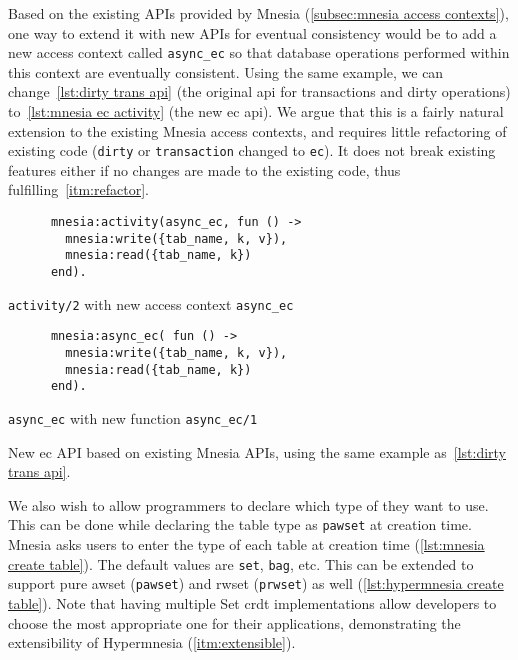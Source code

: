 Based on the existing APIs provided by Mnesia (\cref{subsec:mnesia access contexts}), 
one way to extend it with new APIs for eventual consistency would be to add a
new access context called \texttt{async_ec} so that database operations
performed within this context are eventually consistent. Using
the same example, we can change~\cref{lst:dirty trans api} (the original
\acrshort{api} for transactions and dirty operations) to~\cref{lst:mnesia ec activity} (the
new \acrshort{ec} \acrshort{api}).
We argue that this is a fairly natural extension to the existing Mnesia access contexts,
and requires little refactoring of existing code (\verb|dirty| or \verb|transaction|
changed to \verb|ec|). It does not break existing features either if no changes
are made to the existing code, thus fulfilling~\cref{itm:refactor}.

\begin{listing}[htp]
  \begin{sublisting}{0.48\columnwidth}
    \begin{verbatim}
      mnesia:activity(async_ec, fun () -> 
        mnesia:write({tab_name, k, v}),
        mnesia:read({tab_name, k})
      end).
    \end{verbatim}
    \caption{\texttt{activity/2} with new access context \texttt{async\_ec}}
  \end{sublisting}
  \hfill
  \begin{sublisting}{0.48\columnwidth}
    \begin{verbatim}
      mnesia:async_ec( fun () -> 
        mnesia:write({tab_name, k, v}),
        mnesia:read({tab_name, k})
      end).
    \end{verbatim}
    \caption{\texttt{async\_ec} with new function \texttt{async\_ec/1}}
  \end{sublisting}
  \caption{New \acrfull{ec} API based on existing Mnesia APIs, using the same
  example as~\cref{lst:dirty trans api}.} 
  \label{lst:mnesia ec activity}
\end{listing}

We also wish to allow programmers to declare which type of  they
want to use. This can be done while declaring the table type as \texttt{pawset}
at creation time. Mnesia asks users to enter the type of each
table at creation time (\cref{lst:mnesia create table}). The default values are 
\texttt{set}, \texttt{bag}, etc. This can be extended
to support pure \acrshort{awset} (\texttt{pawset}) and \acrshort{rwset} (\texttt{prwset}) 
as well 
(\cref{lst:hypermnesia create table}). Note that having multiple Set \acrshort{crdt}
implementations allow developers to choose the most appropriate one for their
applications, demonstrating the extensibility of Hypermnesia (\cref{itm:extensible}).

